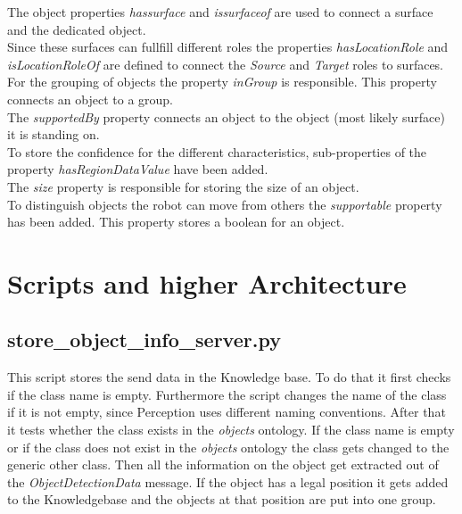 \documentclass[main.tex]{subfiles}
\begin{document}
The object properties \textit{hassurface} and \textit{issurfaceof} are used to connect a surface and the dedicated object.\\
Since these surfaces can fullfill different roles the properties \textit{hasLocationRole} and \textit{isLocationRoleOf} are defined to connect the \textit{Source} and \textit{Target} roles to surfaces.\\
For the grouping of objects the property \textit{inGroup} is responsible. This property connects an object to a group.\\
The \textit{supportedBy} property connects an object to the object (most likely surface) it is standing on.\\
To store the confidence for the different characteristics, sub-properties of the property \textit{hasRegionDataValue} have been added.\\
The \textit{size} property is responsible for storing the size of an object.\\
To distinguish objects the robot can move from others the \textit{supportable} property has been added. This property stores a boolean for an object.



\section{Scripts and higher Architecture}
\subsection{store\_object\_info\_server.py}
This script stores the send data in the Knowledge base.
To do that it first checks if the class name is empty. Furthermore the script changes the name of the class if it is not empty, since Perception uses different naming conventions. After that it tests whether the class exists in the \textit{objects} ontology. If the class name is empty or if the class does not exist in the \textit{objects} ontology the class gets changed to the generic other class. Then all the information on the object get extracted out of the \textit{ObjectDetectionData} message. If the object has a legal position it gets added to the Knowledgebase and the objects at that position are put into one group.

	\endgroup
\end{document}
